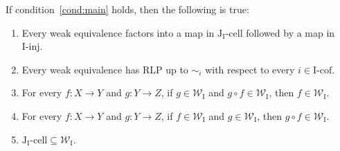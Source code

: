 \documentclass[reqno]{amsart}
\theoremstyle{definition}
\newcommand{\we}{\mathcal{W}}
\newcommand{\I}{\mathrm{I}}
\newcommand{\J}{\mathrm{J}}
\newcommand{\class}[2]{#1\text{-}\mathrm{#2}}
\newcommand{\Iinj}[1][\I]{\class{#1}{inj}}
\newcommand{\Icell}[1][\I]{\class{#1}{cell}}
\newcommand{\Icof}[1][\I]{\class{#1}{cof}}
\newcommand{\Jcell}[1][]{\Icell[\J#1]}
\begin{document}
\begin{lem}[main]
If condition~\eqref{cond:main} holds, then the following is true:
\begin{enumerate}
\item Every weak equivalence factors into a map in $\Jcell[_\I]$ followed by a map in $\Iinj$.
\item Every weak equivalence has RLP up to $\sim_i$ with respect to every $i \in \Icof$.
\item \label{it:we-top} For every $f : X \to Y$ and $g : Y \to Z$, if $g \in \we_\I$ and $g \circ f \in \we_\I$, then $f \in \we_\I$.
\item For every $f : X \to Y$ and $g : Y \to Z$, if $f \in \we_\I$ and $g \in \we_\I$, then $g \circ f \in \we_\I$.
\item $\Jcell[_\I] \subseteq \we_\I$.
\end{enumerate}
\end{lem}
\end{document}
